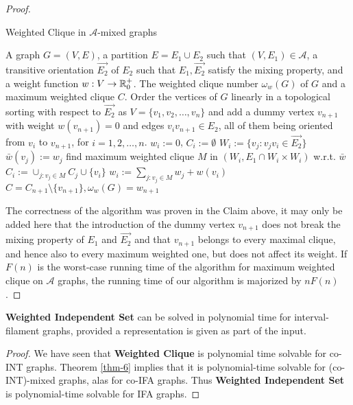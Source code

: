 \begin{proof}
	\begin{algorithm}[!ht]
		\caption{Weighted Clique in $\mathcal{A}$-mixed graphs}
		\begin{algorithmic}[1]
			\Require A graph $G = (V, E)$, a partition $E = E_1 \cup E_2$ such that $(V, E_1) \in \mathcal{A}$, a transitive orientation $\overrightarrow{E_2}$ of $E_2$ such that $E_1 , \overrightarrow{E_2}$ satisfy the mixing property, and a weight function $w : V \to \mathbb{R}_0^+$.
			\Ensure The weighted clique number $\omega_w(G)$ of $G$ and a maximum weighted clique $C$.
			\State Order the vertices of $G$ linearly in a topological sorting with respect to $\overrightarrow{E_2}$ as $V = \{v_1 , v_2 , \dots, v_n\}$ and add a dummy vertex $v_{n+1}$ with weight $w(v_{n+1}) = 0$ and edges $v_i v_{n+1} \in E_2$, all of them being oriented from $v_i$ to $v_{n+1}$, for $i = 1, 2, \dots, n$.
				\State $w_i := 0$, $C_i := \emptyset$
			\EndFor
				\State $W_i := \{v_j : v_j v_i \in \overrightarrow{E_2}\}$
					\State $\bar{w}(v_j) := w_j$
				\EndFor
				\State find maximum weighted clique $M$ in $(W_i, E_1 \cap W_i \times W_i)$ w.r.t. $\bar{w}$
				\State $C_i := \cup_{j:v_j \in M} C_j \cup \{v_i\}$
				\State $w_i := \sum_{j:v_j \in M} w_j + w(v_i)$
			\EndFor
			\State \Return $C = C_{n+1} \setminus \{v_{n+1}\}, \omega_w (G) = w_{n+1}$
		\end{algorithmic}
	\end{algorithm}
	
	The correctness of the algorithm was proven in the Claim above, it may only be added here that the introduction of the dummy vertex $v_{n+1}$ does not break the mixing property of $E_1$ and $\overrightarrow{E_2}$ and that $v_{n+1}$ belongs to every maximal clique, and hence also to every maximum weighted one, but does not affect its weight. If $F(n)$ is the worst-case running time of the algorithm for maximum weighted clique on $\mathcal{A}$ graphs, the running time of our algorithm is majorized by $nF(n)$.
\end{proof}

\begin{cor}
	\textbf{Weighted Independent Set} can be solved in polynomial time for interval-filament graphs, provided a representation is given as part of the input.
\end{cor}

\begin{proof}
	We have seen that \textbf{Weighted Clique} is polynomial time solvable for co-INT graphs. Theorem \ref{thm-6} implies that it is polynomial-time solvable for (co-INT)-mixed graphs, alas for co-IFA graphs. Thus \textbf{Weighted Independent Set} is polynomial-time solvable for IFA graphs.
\end{proof}